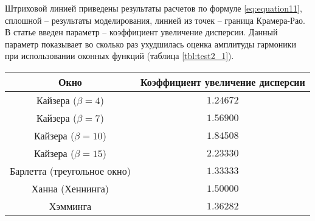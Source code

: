 
Штриховой линией приведены результаты расчетов по формуле \ref{eq:equation11}, сплошной -- результаты моделирования, линией из точек -- граница Крамера-Рао. 
В статье \cite{altman2020boundary} введен параметр -- коэффициент увеличение дисперсии. Данный параметр показывает во сколько раз ухудшилась оценка амплитуды гармоники при использовании оконных функций (таблица \ref{tbl:test2_1}).


\begin{table}[ht]%
	\caption{Зависимость дисперсии оценки амплитуды от дисперсии шума.}
	\label{tbl:test2_1}
	\fontsize{14pt}{14pt}\selectfont
	\begin{longtable*}[c]{|c|c|}  
		\hline
		Окно &
		Коэффициент увеличение дисперсии  \\
		\hline			
		Кайзера ($\beta=4$) & $1.24672$ \\
		\hline
		Кайзера ($\beta=7$) & $1.56900$ \\
		\hline
		Кайзера ($\beta=10$) & $1.84508$ \\
		\hline
		Кайзера ($\beta=15$) & $2.23330$ \\
		\hline
		Барлетта (треугольное окно) & $1.33333$ \\
		\hline
		Ханна (Хеннинга) & $1.50000$ \\
		\hline 
		Хэмминга & $1.36282$ \\
		\hline
	\end{longtable*}%
\end{table}

